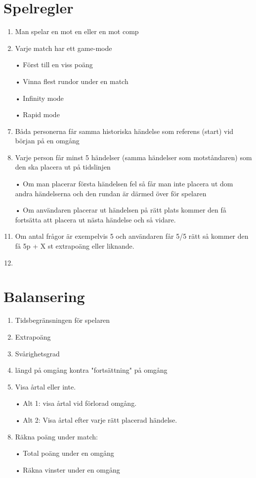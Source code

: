 \documentclass[a4paper,11pt]{article}
\begin{document}
\section{Spelregler}
\begin{enumerate}
\item Man spelar en mot en eller en mot comp
\item Varje match har ett game-mode
\item[•] Först till en viss poäng
\item[•] Vinna flest rundor under en match
\item[•] Infinity mode
\item[•] Rapid mode
\item Båda personerna får samma historiska händelse som referens (start) vid början på en omgång
\item Varje person får minst 5 händelser (samma händelser som motståndaren) som den ska placera ut på tidslinjen
\item[•] Om man placerar första händelsen fel så får man inte placera ut dom andra händelserna och den rundan är därmed över för spelaren
\item[•] Om användaren placerar ut händelsen på rätt plats kommer den få fortsätta att placera ut nästa händelse och så vidare.
\item Om antal frågor är exempelvis 5 och användaren får 5/5 rätt så kommer den få 5p + X st extrapoäng eller liknande.
\item   

\end{enumerate}

\section{Balansering}

\begin{enumerate}
\item Tidsbegränsningen för spelaren
\item Extrapoäng
\item Svårighetsgrad
\item längd på omgång kontra "fortsättning" på omgång
\item Visa årtal eller inte.
\item[•] Alt 1: visa årtal vid förlorad omgång.
\item[•] Alt 2: Visa årtal efter varje rätt placerad händelse.
\item Räkna poäng under match:
\item[•] Total poäng under en omgång
\item[•] Räkna vinster under en omgång


\end{enumerate}
\end{document}
